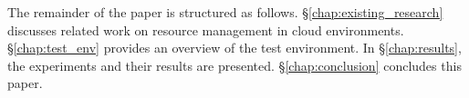 %
The remainder of the paper is structured as follows. %
\S\ref{chap:existing_research} discusses related work on resource management in cloud environments. \S\ref{chap:test_env} provides an overview of the test environment. In \S\ref{chap:results}, the experiments and their results are presented. \S\ref{chap:conclusion} concludes this paper.
